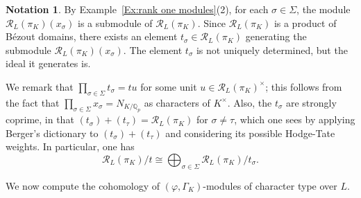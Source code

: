 \documentclass[12pt]{article}
\theoremstyle{definition}
\newtheorem{notation}[theorem]{Notation}
\numberwithin{equation}{theorem}
\newcommand{\calR}{\mathcal{R}}
\newcommand{\QQ}{\mathbb{Q}}
\def\Qp{\QQ_p}
\begin{document}
\begin{notation}
\label{N:t_sigma}
By Example~\ref{Ex:rank one modules}(2), for each $\sigma \in \Sigma$, the module $\calR_L(\pi_K)(x_\sigma)$ is a submodule of $\calR_L(\pi_K)$.  Since $\calR_L(\pi_K)$ is a product of B\'ezout domains, there exists an element $t_\sigma \in \calR_L(\pi_K)$ generating the submodule $\calR_L(\pi_K)(x_\sigma)$. 
The element $t_\sigma$ is not uniquely determined, but the ideal it generates is.

We remark that $\prod_{\sigma \in \Sigma} t_\sigma = tu$ for some unit $u \in \calR_L(\pi_K)^\times$; this follows from the fact that $\prod_{\sigma \in \Sigma} x_\sigma = N_{K/\Qp}$ as characters of $K^\times$.  Also, the $t_\sigma$ are strongly coprime, in that $(t_\sigma) + (t_\tau) = \calR_L(\pi_K)$ for $\sigma \neq \tau$, which one sees by applying Berger's dictionary to $(t_\sigma)+(t_\tau)$ and considering its possible Hodge-Tate weights.  In particular, one has
\begin{equation}\label{E:HT wts decompose}
\calR_L(\pi_K) / t \cong \bigoplus_{\sigma \in \Sigma} \calR_{L}(\pi_K) / t_\sigma.
\end{equation}
\end{notation}

We now compute the cohomology of $(\varphi,
\Gamma_K)$-modules of character type over $L$.
\end{document}

